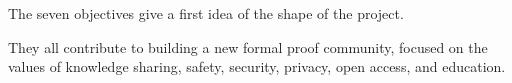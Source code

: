 The seven objectives give a first idea of the shape of the project.

They all contribute to building a new formal proof community, focused
on the values of knowledge sharing, safety, security, privacy, open
access, and education.

